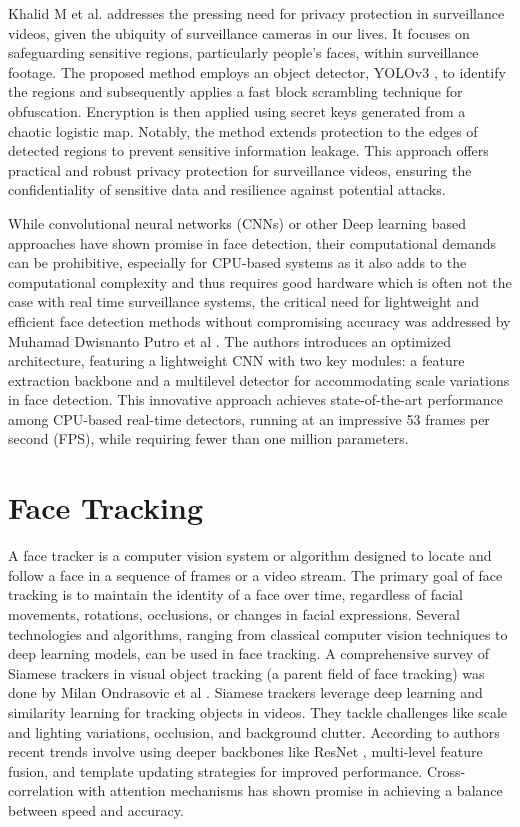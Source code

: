 Khalid M et al. \cite{hosny_privacy_2022} addresses the pressing need for privacy protection in surveillance videos, given the ubiquity of surveillance cameras in our lives. It focuses on safeguarding sensitive regions, particularly people's faces, within surveillance footage. The proposed method employs an object detector, YOLOv3 \cite{aziz_exploring_2020}, to identify the regions and subsequently applies a fast block scrambling technique for obfuscation. Encryption is then applied using secret keys generated from a chaotic logistic map. Notably, the method extends protection to the edges of detected regions to prevent sensitive information leakage. This approach offers practical and robust privacy protection for surveillance videos, ensuring the confidentiality of sensitive data and resilience against potential attacks.

While convolutional neural networks (CNNs) or other Deep learning based approaches have shown promise in face detection, their computational demands can be prohibitive, especially for CPU-based systems as it also adds to the computational complexity and thus requires good hardware which is often not the case with real time surveillance systems, the critical need for lightweight and efficient face detection methods without compromising accuracy was addressed by Muhamad Dwisnanto Putro et al \cite{putro_high_2021}. The authors introduces an optimized architecture, featuring a lightweight CNN with two key modules: a feature extraction backbone and a multilevel detector for accommodating scale variations in face detection. This innovative approach achieves state-of-the-art performance among CPU-based real-time detectors, running at an impressive 53 frames per second (FPS), while requiring fewer than one million parameters.

\section{Face Tracking} \label{section:ft}
A face tracker is a computer vision system or algorithm designed to locate and follow a face in a sequence of frames or a video stream. The primary goal of face tracking is to maintain the identity of a face over time, regardless of facial movements, rotations, occlusions, or changes in facial expressions. Several technologies and algorithms, ranging from classical computer vision techniques to deep learning models, can be used in face tracking. A comprehensive survey of Siamese trackers in visual object tracking (a parent field of face tracking) was done by Milan Ondrasovic et al \cite{ondrasovic_siamese_2021}. Siamese trackers leverage deep learning and similarity learning for tracking objects in videos. They tackle challenges like scale and lighting variations, occlusion, and background clutter. According to authors recent trends involve using deeper backbones like ResNet \cite{aziz_exploring_2020}, multi-level feature fusion, and template updating strategies for improved performance. Cross-correlation with attention mechanisms has shown promise in achieving a balance between speed and accuracy.

